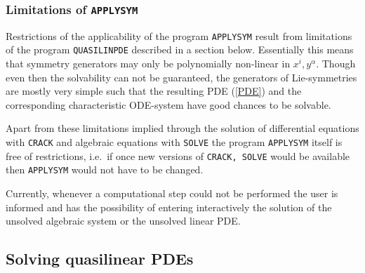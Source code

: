 \subsubsection{Limitations of \texttt{APPLYSYM}}
Restrictions of the applicability of the program \texttt{APPLYSYM} result
from limitations of the program \texttt{QUASILINPDE} described in a section below.
Essentially this means that symmetry generators may only be polynomially
non-linear in $x^i, y^\alpha$.
Though even then the solvability can not be guaranteed, the
generators of Lie-symmetries are mostly very simple such that the
resulting PDE (\ref{PDE}) and the corresponding characteristic 
ODE-system have good chances to be solvable.

Apart from these limitations implied through the solution of differential
equations with \texttt{CRACK} and algebraic equations with \texttt{SOLVE}
the program \texttt{APPLYSYM} itself is free of restrictions,
i.e.\ if once new versions of \texttt{CRACK, SOLVE}
would be available then \texttt{APPLYSYM} would not have to be changed.

Currently, whenever a computational step could not be performed
the user is informed and has the possibility of entering interactively
the solution of the unsolved algebraic system or the unsolved linear PDE.
\subsection{Solving quasilinear PDEs}
